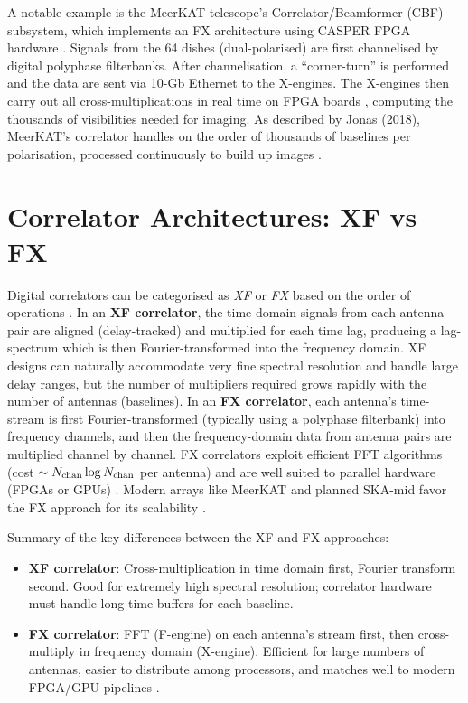 A notable example is the MeerKAT telescope’s Correlator/Beamformer (CBF) subsystem, which implements an FX architecture using CASPER FPGA hardware \cite{Jonas2018}. Signals from the 64 dishes (dual-polarised) are first channelised by digital polyphase filterbanks. After channelisation, a “corner-turn” is performed and the data are sent via 10-Gb Ethernet to the X-engines. The X-engines then carry out all cross-multiplications in real time on FPGA boards \cite{Jonas2018}, computing the thousands of visibilities needed for imaging. As described by Jonas (2018), MeerKAT’s correlator handles on the order of thousands of baselines per polarisation, processed continuously to build up images \cite{Jonas2018}.

    \section{Correlator Architectures: XF vs FX}
    Digital correlators can be categorised as \emph{XF} or \emph{FX} based on the order of operations \cite{Wang2024}. In an \textbf{XF correlator}, the time-domain signals from each antenna pair are aligned (delay-tracked) and multiplied for each time lag, producing a lag-spectrum which is then Fourier-transformed into the frequency domain. XF designs can naturally accommodate very fine spectral resolution and handle large delay ranges, but the number of multipliers required grows rapidly with the number of antennas (baselines). In an \textbf{FX correlator}, each antenna’s time-stream is first Fourier-transformed (typically using a polyphase filterbank) into frequency channels, and then the frequency-domain data from antenna pairs are multiplied channel by channel. FX correlators exploit efficient FFT algorithms (cost $\sim N_{\rm chan}\log N_{\rm chan}$ per antenna) and are well suited to parallel hardware (FPGAs or GPUs) \cite{Wang2024,Jonas2018}. Modern arrays like MeerKAT and planned SKA-mid favor the FX approach for its scalability \cite{Wang2024}. 
    
    Summary of the key differences between the XF and FX approaches:
    
    \begin{itemize}
        \item \textbf{XF correlator}: Cross-multiplication in time domain first, Fourier transform second. Good for extremely high spectral resolution; correlator hardware must handle long time buffers for each baseline.
     
        \item \textbf{FX correlator}: FFT (F-engine) on each antenna’s stream first, then cross-multiply in frequency domain (X-engine). Efficient for large numbers of antennas, easier to distribute among processors, and matches well to modern FPGA/GPU pipelines \cite{Wang2024}.
    \end{itemize}
    
